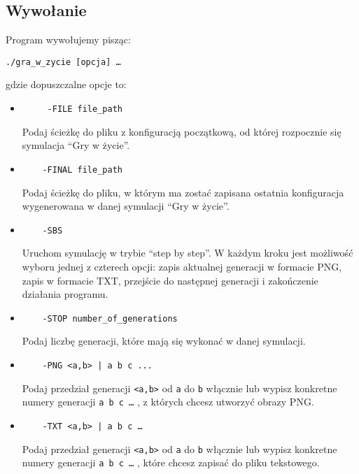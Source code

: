 \documentclass[12pt,a4paper,notitlepage]{report}
\begin{document}
\subsection{Wywołanie}
Program wywołujemy pisząc:
\begin{verbatim}
./gra_w_zycie [opcja] …
\end{verbatim}
gdzie dopuszczalne opcje to:
\begin{itemize}
	\item
	\begin{verbatim}
	 -FILE file_path
	\end{verbatim}
	Podaj ścieżkę do pliku z konfiguracją początkową, od której rozpocznie się symulacja “Gry w życie”.
	
	\item
	\begin{verbatim}
	-FINAL file_path
	\end{verbatim}
	Podaj ścieżkę do pliku, w którym ma zostać zapisana ostatnia konfiguracja wygenerowana w danej symulacji “Gry w życie”.
	
	\item
	\begin{verbatim}
	-SBS
	\end{verbatim}
	Uruchom symulację w trybie “step by step”. W każdym kroku jest możliwość wyboru jednej z czterech opcji: zapis aktualnej generacji w formacie PNG, zapis w formacie TXT, przejście do następnej generacji i zakończenie działania programu.
	
	\item
	\begin{verbatim}
	-STOP number_of_generations
	\end{verbatim}
	Podaj liczbę generacji, które mają się wykonać w danej symulacji.
	
	\item
	\begin{verbatim}
	-PNG <a,b> | a b c ...
	\end{verbatim}
	Podaj przedział generacji \verb|<a,b>| od \verb|a| do \verb|b| włącznie lub wypisz konkretne numery generacji \verb|a b c …| , z których chcesz utworzyć obrazy PNG.
	
	\item
	\begin{verbatim}
	-TXT <a,b> | a b c …
	\end{verbatim}
	Podaj przedział generacji \verb|<a,b>| od \verb|a| do \verb|b| włącznie lub wypisz konkretne numery generacji \verb|a b c …| , które chcesz zapisać do pliku tekstowego.
	
\end{itemize}
\end{document}
